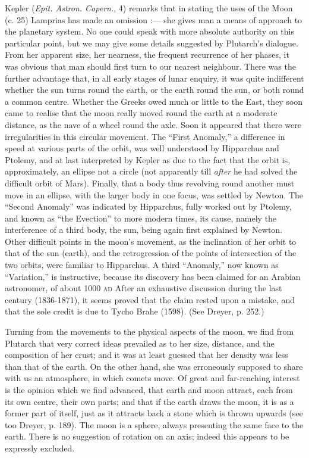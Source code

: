 \documentclass[a4paper, 11pt, oneside, polutonikogreek, english]{article}
\begin{document}
Kepler (\emph{Epit. Astron. Copern.}, 4) remarks that in stating the uses of the Moon (c. 25) Lamprias has made an omission :--- she gives man a means of approach to the planetary system. No one could speak with more absolute authority on this particular point, but we may give some details suggested by Plutarch's dialogue. From her apparent size, her nearness, the frequent recurrence of her phases, it was obvious that man should first turn to our nearest neighbour. There was the further advantage that, in all early stages of lunar enquiry, it was quite indifferent whether the sun turns round the earth, or the earth round the sun, or both round a common centre. Whether the Greeks owed much or little to the East, they soon came to realise that the moon really moved round the earth at a moderate distance, as the nave of a wheel round the axle. Soon it appeared that there were irregularities in this circular movement. The ``First Anomaly,'' a difference in speed at various parts of the orbit, was well understood by Hipparchus and Ptolemy, and at last interpreted by Kepler as due to the fact that the orbit is, approximately, an ellipse not a circle (not apparently till \emph{after} he had solved the difficult orbit of Mars). Finally, that a body thus revolving round another must move in an ellipse, with the larger body in one focus, was settled by Newton. The ``Second Anomaly'' was indicated by Hipparchus, fully worked out by Ptolemy, and known as ``the Evection'' to more modern times, its cause, namely the interference of a third body, the sun, being again first explained by Newton. Other difficult points in the moon's movement, as the inclination of her orbit to that of the sun (earth), and the retrogression of the points of intersection of the two orbits, were familiar to Hipparchus. A third ``Anomaly,'' now known as ``Variation,'' is instructive, because its discovery has been claimed for an Arabian astronomer, of about 1000 \textsc{ad} After an exhaustive discussion during the last century (1836-1871), it seems proved that the claim rested upon a mistake, and that the sole credit is due to Tycho Brahe (1598). (See Dreyer, p. 252.)

Turning from the movements to the physical aspects of the moon, we find from Plutarch that very correct ideas prevailed as to her size, distance, and the composition of her crust; and it was at least guessed that her density was less than that of the earth. On the other hand, she was erroneously supposed to share with us an atmosphere, in which comets move. Of great and far-reaching interest is the opinion which we find advanced, that earth and moon attract, each from its own centre, their own parts; and that if the earth draws the moon, it is as a former part of itself, just as it attracts back a stone which is thrown upwards (see too Dreyer, p. 189). The moon is a sphere, always presenting the same face to the earth. There is no suggestion of rotation on an axis; indeed this appears to be expressly excluded.
\end{document}
